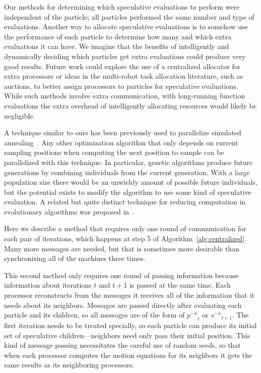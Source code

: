 \documentclass[journal,letterpaper]{IEEEtran}
\newcommand{\alg}[1]{Algorithm~\ref{alg:#1}}
\providecommand{\nonbest}[1]{\ensuremath{#1^{-n}}}
\providecommand{\p}{\ensuremath{p}}
\providecommand{\s}{\ensuremath{s}}
\begin{document}
Our methods for determining which speculative evaluations to perform were
independent of the particle; all particles performed the same number and type
of evaluations.  Another way to allocate speculative evaluations is to somehow
use the performance of each particle to determine how many and which extra
evaluations it can have.  We imagine that the benefits of intelligently and
dynamically deciding which particles get extra evaluations could produce very
good results.  Future work could explore the use of a centralized allocator for
extra processors or ideas in the multi-robot task allocation literature, such
as auctions, to better assign processors to particles for speculative
evaluations.  While such methods involve extra communication, with long-running
function evaluations the extra overhead of intelligently allocating resources
would likely be negligible.

A technique similar to ours has been previously used to parallelize simulated
annealing~\cite{witte-1991-parallel-simulated-annealing-speculative}.  Any
other optimization algorithm that only depends on current sampling positions
when computing the next position to sample can be parallelized with this
technique.  In particular, genetic algorithms produce future generations by
combining individuals from the current generation.  With a large population
size there would be an unwieldy amount of possible future individuals, but the
potential exists to modify the algorithm to use some kind of speculative
evaluation.  A related but quite distinct technique for reducing computation in
evolutionary algorithms was proposed
in~\cite{poli-2006-backward-chaining-evolutionary-algorithms}.


Here we describe a method that requires only one round of communication for
each pair of iterations, which happens at step 5 of \alg{centralized}.  Many
more messages are needed, but that is sometimes more desirable than
synchronizing all of the machines three times.

This second method only requires one round of passing information because
information about iterations $t$ and $t+1$ is passed at the same time.  Each
processor reconstructs from the messages it receives all of the information
that it needs about its neighbors.  Messages are passed directly after
evaluating each particle and its children, so all messages are of the form of
$\nonbest{\p}_t$ or $\nonbest{\s}_{t+1}$.  The first iteration needs to be
treated specially, so each particle can produce its initial set of speculative
children---neighbors need only pass their initial position.  This kind of
message passing necessitates the careful use of random seeds, so that when each
processor computes the motion equations for its neighbors it gets the same
results as its neighboring processors.
\end{document}

